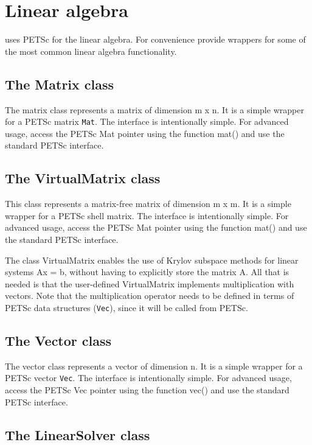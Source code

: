 \chapter{Linear algebra}

\dolfin{} uses PETSc for the linear algebra. For convenience \dolfin{} provide 
wrappers for some of the most common linear algebra functionality.   

\section{The Matrix class}

The matrix class represents a matrix of dimension m x n. It is a
simple wrapper for a PETSc matrix \texttt{Mat}. The interface is
intentionally simple. For advanced usage, access the PETSc Mat
pointer using the function mat() and use the standard PETSc
interface.

\section{The VirtualMatrix class}

This class represents a matrix-free matrix of dimension m x m.
It is a simple wrapper for a PETSc shell matrix. The interface
is intentionally simple. For advanced usage, access the PETSc
Mat pointer using the function mat() and use the standard PETSc
interface.

The class VirtualMatrix enables the use of Krylov subspace
methods for linear systems Ax = b, without having to explicitly
store the matrix A. All that is needed is that the user-defined
VirtualMatrix implements multiplication with vectors. Note that
the multiplication operator needs to be defined in terms of
PETSc data structures (\texttt{Vec}), since it will be called from PETSc.


\section{The Vector class}

The vector class represents a vector of dimension n. It is a
simple wrapper for a PETSc vector \texttt{Vec}. The interface is
intentionally simple. For advanced usage, access the PETSc Vec
pointer using the function vec() and use the standard PETSc
interface.

\section{The LinearSolver class}

